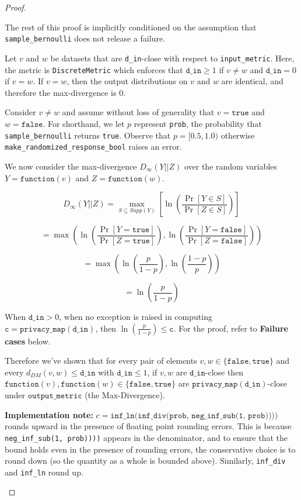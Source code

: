 \documentclass[11pt,a4paper]{article}
\newcommand{\vicki}[1]{{ {\color{olive}{(vicki)~#1}}}}
\newcommand{\din}{\texttt{d\_in}}
\newcommand{\function}{\texttt{function}}
\theoremstyle{definition}
\begin{document}
\begin{proof}
\begin{enumerate}
    The rest of this proof is implicitly conditioned on the assumption that \texttt{sample\_bernoulli} does not release a failure. 
    
    Let $v$ and $w$ be datasets that are \texttt{d\_in}-close with respect to \texttt{input\_metric}. Here, the metric is \texttt{DiscreteMetric} which enforces that $\din \geq 1$ if $v \ne w$ and $\din = 0$ if $v = w$. If $v = w$, then the output distributions on $v$ and $w$ are identical, and therefore the max-divergence is 0.
    
    Consider $v \ne w$ and assume without loss of generality that $v = \texttt{true}$ and $w = \texttt{false}$. For shorthand, we let $p$ represent \texttt{prob}, the probability that \texttt{sample\_bernoulli} returns \texttt{true}. Observe that $p = [0.5, 1.0)$ otherwise \texttt{make\_randomized\_response\_bool} raises an error. 
    
    We now consider the max-divergence $D_{\infty}(Y||Z)$ over the random variables $Y = \function(v)$ and $Z = \function(w)$.
    
    \[
    D_{\infty}(Y||Z) = \max_{S \subseteq Supp(Y)}\left[\ln (\frac{\Pr[Y \in S]}{\Pr[Z \in S]})\right] 
    \]
    
    \[
    = \max\left(\ln (\frac{\Pr[Y = \texttt{true}]}{\Pr[Z = \texttt{true}]}), \ln(\frac{\Pr[Y = \texttt{false}]}{\Pr[Z = \texttt{false}]})\right)
    \]
    
    \[
    = \max\left(\ln (\frac{p}{1 - p}), \ln(\frac{1 - p}{p})\right)
    \]
    
    \[
    = \ln (\frac{p}{1 - p})
    \]
    
    When $\din > 0$, when no exception is raised in computing $\texttt{c} = \texttt{privacy\_map}(\din)$, then $\ln\left(\frac{p}{1 - p}\right) \leq \texttt{c}$. For the proof, refer to \textbf{Failure cases} below. \vicki{is this a little weird/roundabout? maybe we should move the failure cases up here.} 
    
    Therefore we've shown that for every pair of elements $v,w \in \{\texttt{false}, \texttt{true}\}$ and every $d_{DM}(v,w) \le \din$ with $\din \le 1$, if $v,w$ are $\din$-close then $\function(v),\function(w) \in \{\texttt{false},\texttt{true}\}$ are $\texttt{privacy\_map}(\din)$-close under $\texttt{output\_metric}$ (the Max-Divergence).
    
    \begin{tcolorbox}
    \textbf{Implementation note:} $c = \texttt{inf\_ln(inf\_div(prob, neg\_inf\_sub(1, prob))))}$ rounds upward in the presence of floating point rounding errors. This is because \texttt{neg\_inf\_sub(1, prob))))} appears in the denominator, and to ensure that the bound holds even in the presence of rounding errors, the conservative choice is to round down (so the quantity as a whole is bounded above). Similarly, \texttt{inf\_div} and \texttt{inf\_ln} round up. 
    \end{tcolorbox}
    

\end{enumerate}
\end{proof}
\end{document}
